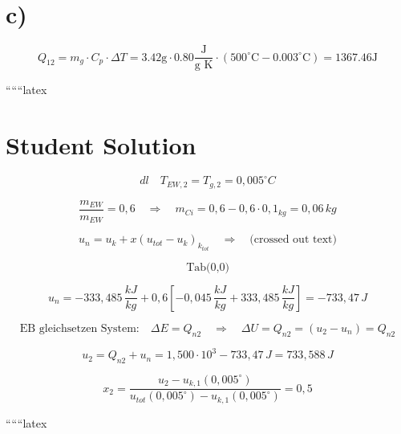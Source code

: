 

\section*{c)}

\[
Q_{12} = m_g \cdot C_p \cdot \Delta T = 3.42 \text{g} \cdot 0.80 \frac{\text{J}}{\text{g K}} \cdot (500^\circ \text{C} - 0.003^\circ \text{C}) = 1367.46 \text{J}
\]

``````latex


\section*{Student Solution}

\begin{equation}
d l \quad T_{EW,2} = T_{g,2} = 0,005^\circ C
\end{equation}

\begin{equation}
\frac{m_{EW}}{m_{EW}} = 0,6 \quad \Rightarrow \quad m_{Ci} = 0,6 - 0,6 \cdot 0,1_{kg} = 0,06 \, kg
\end{equation}

\begin{equation}
u_{n} = u_{k} + x \left( u_{tot} - u_{k} \right)_{k_{tot}} \quad \Rightarrow \quad \text{(crossed out text)}
\end{equation}

\begin{equation}
\text{Tab(0,0)}
\end{equation}

\begin{equation}
u_{n} = -333,485 \, \frac{kJ}{kg} + 0,6 \left[ -0,045 \, \frac{kJ}{kg} + 333,485 \, \frac{kJ}{kg} \right] = -733,47 \, J
\end{equation}

\begin{equation}
\text{EB gleichsetzen System:} \quad \Delta E = Q_{n2} \quad \Rightarrow \quad \Delta U = Q_{n2} = (u_{2} - u_{n}) = Q_{n2}
\end{equation}

\begin{equation}
u_{2} = Q_{n2} + u_{n} = 1,500 \cdot 10^{3} - 733,47 \, J = 733,588 \, J
\end{equation}

\begin{equation}
x_{2} = \frac{u_{2} - u_{k,1} (0,005^\circ)}{u_{tot}(0,005^\circ) - u_{k,1} (0,005^\circ)} = 0,5
\end{equation}

``````latex